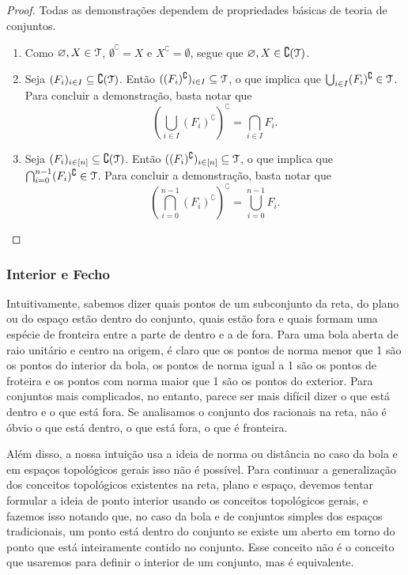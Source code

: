 \begin{proof} Todas as demonstrações dependem de propriedades básicas de teoria de conjuntos.
	\begin{enumerate}
	\item Como $\varnothing,X \in \mathcal{T}$, $\emptyset^\complement = X$ e $X^\complement = \emptyset$, segue que $\varnothing,X \in \complement (\mathcal{T})$.
	
	\item  Seja $(F_i)_{i \in I} \subseteq \complement (\mathcal{T})$. Então $((F_i)^\complement)_{i \in I} \subseteq \mathcal{T}$, o que implica que $\bigcup_{i \in I} (F_i)^\complement \in \mathcal{T}$. Para concluir a demonstração, basta notar que
	\begin{equation*}
	\left( \bigcup_{i \in I} (F_i)^\complement \right)^\complement = \bigcap_{i \in I} F_i.
	\end{equation*}
	
	\item Seja $(F_i)_{i \in [n]} \subseteq \complement (\mathcal{T})$. Então $((F_i)^\complement)_{i \in [n]} \subseteq \mathcal{T}$, o que implica que $\bigcap_{i=0}^{n-1} (F_i)^\complement \in \mathcal{T}$. Para concluir a demonstração, basta notar que
	\begin{equation*}
	\left( \bigcap_{i=0}^{n-1} (F_i)^\complement \right)^\complement = \bigcup_{i=0}^{n-1} F_i.
	\end{equation*}
\qedhere
	\end{enumerate}
\end{proof}

\subsubsection{Interior e Fecho}

	Intuitivamente, sabemos dizer quais pontos de um subconjunto da reta, do plano ou do espaço estão dentro do conjunto, quais estão fora e quais formam uma espécie de fronteira entre a parte de dentro e a de fora. Para uma bola aberta de raio unitário e centro na origem, é claro que os pontos de norma menor que 1 são os pontos do interior da bola, os pontos de norma igual a 1 são os pontos de froteira e os pontos com norma maior que 1 são os pontos do exterior. Para conjuntos mais complicados, no entanto, parece ser mais difícil dizer o que está dentro e o que está fora. Se analisamos o conjunto dos racionais na reta, não é óbvio o que está dentro, o que está fora, o que é fronteira.
	
	Além disso, a nossa intuição usa a ideia de norma ou distância no caso da bola e em espaços topológicos gerais isso não é possível. Para continuar a generalização dos conceitos topológicos existentes na reta, plano e espaço, devemos tentar formular a ideia de ponto interior usando os conceitos topológicos gerais, e fazemos isso notando que, no caso da bola e de conjuntos simples dos espaços tradicionais, um ponto está dentro do conjunto se existe um aberto em torno do ponto que está inteiramente contido no conjunto. Esse conceito não é o conceito que usaremos para definir o interior de um conjunto, mas é equivalente.
	
